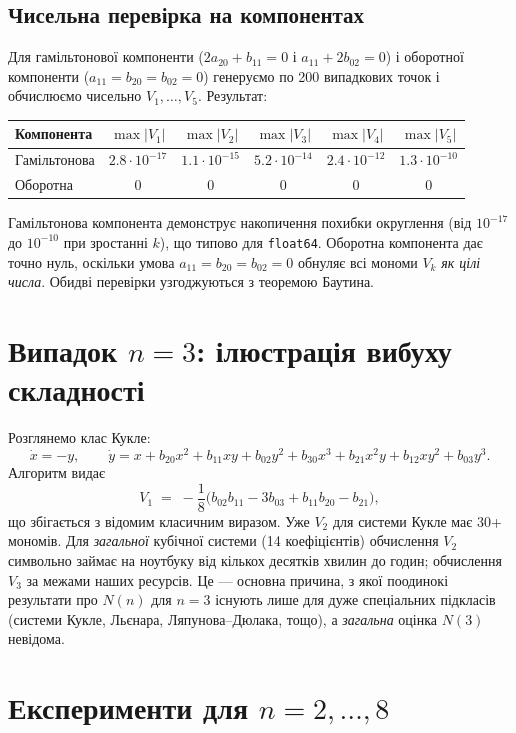 \documentclass[12pt,a4paper]{article}
\begin{document}
\subsection{Чисельна перевірка на компонентах}

Для гамільтонової компоненти ($2a_{20}+b_{11}=0$ і $a_{11}+2b_{02}=0$) і оборотної компоненти ($a_{11}=b_{20}=b_{02}=0$) генеруємо по 200 випадкових точок і обчислюємо чисельно $V_1,\dots,V_5$. Результат:

\begin{center}
\begin{tabular}{lccccc}
\toprule
Компонента & $\max|V_1|$ & $\max|V_2|$ & $\max|V_3|$ & $\max|V_4|$ & $\max|V_5|$ \\
\midrule
Гамільтонова  & $2{.}8\cdot10^{-17}$ & $1{.}1\cdot10^{-15}$ & $5{.}2\cdot10^{-14}$ & $2{.}4\cdot10^{-12}$ & $1{.}3\cdot10^{-10}$ \\
Оборотна      & $0$ & $0$ & $0$ & $0$ & $0$ \\
\bottomrule
\end{tabular}
\end{center}

Гамільтонова компонента демонструє накопичення похибки округлення (від $10^{-17}$ до $10^{-10}$ при зростанні $k$), що типово для \texttt{float64}. Оборотна компонента дає точно нуль, оскільки умова $a_{11}=b_{20}=b_{02}=0$ обнуляє всі мономи $V_k$ \emph{як цілі числа}. Обидві перевірки узгоджуються з теоремою Баутина.

\section{Випадок $n=3$: ілюстрація вибуху складності}\label{sec:n3}

Розглянемо клас Кукле:
\[
\dot x = -y, \qquad
\dot y = x + b_{20}x^2 + b_{11}xy + b_{02}y^2 + b_{30}x^3 + b_{21}x^2y + b_{12}xy^2 + b_{03}y^3.
\]
Алгоритм видає
\[
V_1 \;=\; -\frac{1}{8}\bigl(b_{02}b_{11} - 3b_{03} + b_{11}b_{20} - b_{21}\bigr),
\]
що збігається з відомим класичним виразом. Уже $V_2$ для системи Кукле має 30+ мономів. Для \emph{загальної} кубічної системи (14 коефіцієнтів) обчислення $V_2$ символьно займає на ноутбуку від кількох десятків хвилин до годин; обчислення $V_3$ за межами наших ресурсів. Це --- основна причина, з якої поодинокі результати про $N(n)$ для $n=3$ існують лише для дуже спеціальних підкласів (системи Кукле, Льєнара, Ляпунова--Дюлака, тощо), а \emph{загальна} оцінка $N(3)$ невідома.

\section{Експерименти для $n=2,\dots,8$}\label{sec:exp}
\end{document}
